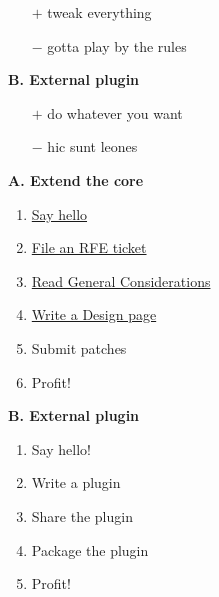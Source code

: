 \documentclass[20pt]{beamer}
\begin{document}
\begin{center}
\begin{frame}[fragile]
    \bigskip

    \begin{itemize}
    \item[$+$] tweak everything
    \item[$-$] gotta play by the rules
    \end{itemize}

    \bigskip\bigskip

    \textbf{B. External plugin}

    \bigskip

    \begin{itemize}
    \item[$+$] do whatever you want
    \item[$-$] hic sunt leones
    \end{itemize}
\end{frame}

\begin{frame}[fragile]
    \textbf{A. Extend the core}
    \bigskip\bigskip

    \begin{enumerate}
    \item \href{www.redhat.com/mailman/listinfo/freeipa-devel}{Say hello}
    \item \href{https://fedorahosted.org/freeipa/report/3}{File an RFE ticket}
    \item \href{http://www.freeipa.org/page/General_considerations}{Read General Considerations}
    \item \href{http://www.freeipa.org/page/V3_Proposals}{Write a Design page}
    \item Submit patches
    \item Profit!
    \end{enumerate}
\end{frame}

\begin{frame}[fragile]
    \textbf{B. External plugin}
    \bigskip\bigskip

    \begin{enumerate}
    \item Say hello!
    \item Write a plugin
    \item Share the plugin
    \item Package the plugin
    \item Profit!
    \end{enumerate}
\end{frame}

\frame{

}
\end{center}
\end{document}
